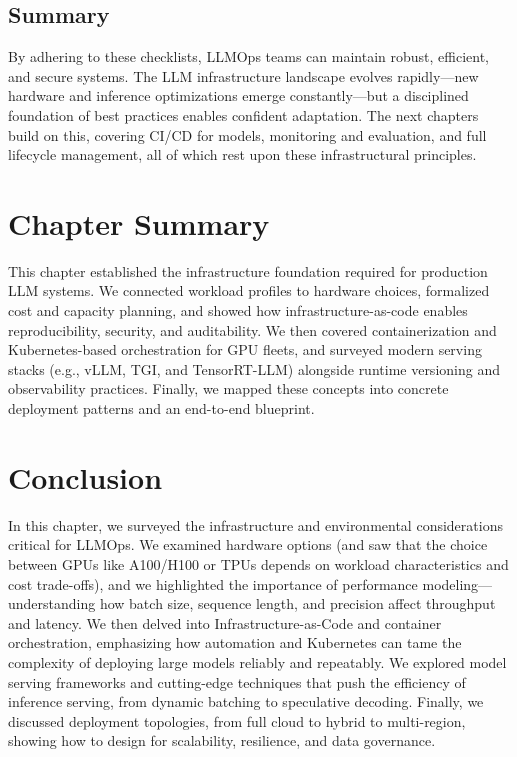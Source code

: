 \subsection{Summary}\label{sec:checklists-summary}
By adhering to these checklists, LLMOps teams can maintain robust, efficient, and secure systems. The LLM infrastructure landscape evolves rapidly—new hardware and inference optimizations emerge constantly—but a disciplined foundation of best practices enables confident adaptation. The next chapters build on this, covering CI/CD for models, monitoring and evaluation, and full lifecycle management, all of which rest upon these infrastructural principles.


\section*{Chapter Summary}
This chapter established the infrastructure foundation required for production LLM systems.
We connected workload profiles to hardware choices, formalized cost and capacity planning, and showed how infrastructure-as-code enables reproducibility, security, and auditability.
We then covered containerization and Kubernetes-based orchestration for GPU fleets, and surveyed modern serving stacks (e.g., vLLM, TGI, and TensorRT-LLM) alongside runtime versioning and observability practices.
Finally, we mapped these concepts into concrete deployment patterns and an end-to-end \ishtar{} blueprint.

\section{Conclusion}
\label{sec:infra-conclusion}

In this chapter, we surveyed the infrastructure and environmental considerations critical for LLMOps. We examined hardware options (and saw that the choice between GPUs like A100/H100 or TPUs depends on workload characteristics and cost trade-offs), and we highlighted the importance of performance modeling—understanding how batch size, sequence length, and precision affect throughput and latency. We then delved into Infrastructure-as-Code and container orchestration, emphasizing how automation and Kubernetes can tame the complexity of deploying large models reliably and repeatably. We explored model serving frameworks and cutting-edge techniques that push the efficiency of inference serving, from dynamic batching to speculative decoding. Finally, we discussed deployment topologies, from full cloud to hybrid to multi-region, showing how to design for scalability, resilience, and data governance.

